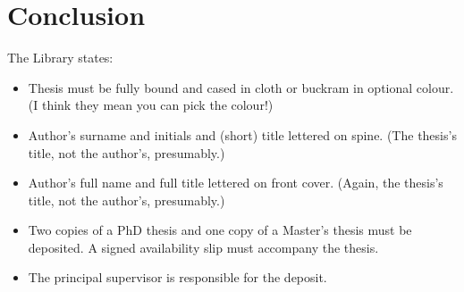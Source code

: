 \chapter{Conclusion}\label{C:conc}

The Library states:
\begin{itemize}
\item Thesis must be fully bound and cased in cloth or buckram in optional colour. (I think they mean you can pick the colour!)
\item Author's surname and initials and (short) title lettered on spine. (The thesis's title, not the author's, presumably.)
\item Author's full name and full title lettered on front cover. (Again, the thesis's title, not the author's, presumably.)
\item Two copies of a PhD thesis and one copy of a Master's thesis must be deposited. A signed availability slip must accompany the thesis.
\item  The principal supervisor is responsible for the deposit.
\end{itemize}